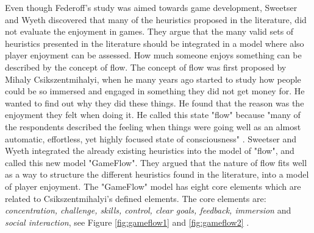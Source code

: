 Even though Federoff's study was aimed towards game development, Sweetser and Wyeth discovered that many of the heuristics proposed in the literature, did not evaluate the enjoyment in games. They argue that the many valid sets of heuristics presented in the literature should be integrated in a model where also player enjoyment can be assessed. How much someone enjoys something can be described by the concept of flow. The concept of flow was first proposed by  Mihaly Csikszentmihalyi, when he many years ago started  to study how people could be so immersed and engaged in something they did not get money for. He wanted to find out why they did these things. He found that the reason was the enjoyment they felt when doing it. He called this state "flow" because "many of the respondents described the feeling when things were going well as an almost automatic, effortless, yet highly focused state of consciousness" \cite{flow}.  Sweetser and Wyeth integrated the already existing heuristics into the model of "flow", and called this new model "GameFlow".  They argued that the nature of flow fits well as a way to structure the different heuristics found in the literature, into a model of player enjoyment. The "GameFlow" model has eight core elements which are related to Csikszentmihalyi's defined elements. The core elements are: \emph{concentration, challenge, skills, control, clear goals, feedback, immersion} and \emph{social interaction}, see Figure \ref{fig:gameflow1} and \ref{fig:gameflow2} \cite{sweetser}. 

